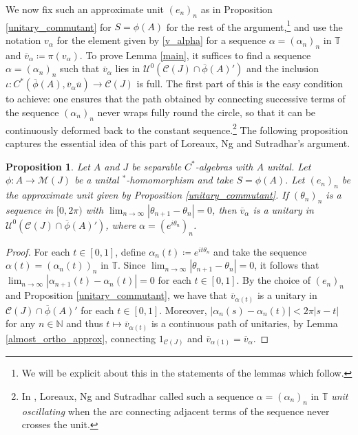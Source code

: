 \documentclass[reqno]{amsart}
\newtheorem{prop}[thm]{Proposition}
\theoremstyle{definition}
\theoremstyle{remark}
\numberwithin{equation}{section}
\theoremstyle{definition}
\newcommand{\calC}{\mathcal{C}}
\newcommand{\calM}{\mathcal{M}}
\newcommand{\calU}{\mathcal{U}}
\begin{document}
We now fix such an approximate unit $(e_n)_{n}$ as in Proposition \ref{unitary_commutant} for $S=\phi(A)$ for the rest of the argument,\footnote{We will be explicit about this in the statements of the lemmas which follow.} and use the notation $v_{\alpha}$ for the element given by \eqref{v_alpha} for a sequence $\alpha = (\alpha_{n})_{n}$ in $\mathbb{T}$ and $\overline{v}_\alpha\coloneqq \pi(v_\alpha)$. To prove Lemma \ref{main}, it suffices to find a sequence $\alpha = (\alpha_n)_n$ such that $\overline{v}_{\alpha}$ lies in $\calU^{0}(\mathcal C(J)\cap \overline\phi(A)')$ and the inclusion $\iota: C^*(\overline{\phi}(A),\overline{v}_{\alpha} \overline{u})\rightarrow \calC(J)$ is full. The first part of this is the easy condition to achieve: one ensures that the path obtained by connecting successive terms of the sequence $(\alpha_n)_{n}$ never wraps fully round the circle, so that it can be continuously deformed back to the constant sequence.\footnote{In \cite{K1-injective}, Loreaux, Ng and Sutradhar called such a sequence  $\alpha = (\alpha_{n})_{n}$ in $\mathbb{T}$ \emph{unit oscillating} when the arc connecting adjacent terms of the sequence never crosses the unit.} The following proposition captures the essential idea of this part of Loreaux, Ng and Sutradhar's argument. 

\begin{prop} 
\label{unit_osci} 
Let $A$ and $J$ be separable $C^*$-algebras with $A$ unital. Let $\phi: A\rightarrow \calM(J)$ be a unital $^*$-homomorphism and take $S = \phi(A)$. Let $(e_n)_{n}$ be the approximate unit given by Proposition \ref{unitary_commutant}. If $(\theta_n)_{n}$ is a sequence in $[0,2\pi)$ with $\lim_{n\rightarrow\infty}|\theta_{n+1}-\theta_{n}| = 0$, then $\overline{v}_{\alpha}$ is a unitary in $\calU^0(\calC(J)\cap\overline\phi(A)')$, where $\alpha = (e^{i\theta_{n}})_{n}$. 
\end{prop} 

\begin{proof} 
For each $t\in [0,1]$, define $\alpha_{n}(t) \coloneqq e^{it\theta_{n}}$ and take the sequence $\alpha(t) = (\alpha_{n}(t))_{n}$ in $\mathbb{T}$. Since $\lim_{n\rightarrow \infty}|\theta_{n+1}-\theta_{n}| = 0$, it follows that $\lim_{n\rightarrow \infty}|\alpha_{n+1}(t)-\alpha_{n}(t)| = 0$ for each $t\in [0,1]$. By the choice of $(e_{n})_{n}$ and Proposition \ref{unitary_commutant}, we have that $\overline{v}_{\alpha(t)}$ is a unitary in $\calC(J)\cap \overline{\phi}(A)'$ for each $t\in [0,1]$. Moreover, $|\alpha_{n}(s) - \alpha_{n}(t)| < 2\pi |s-t|$ for any $n\in \mathbb{N}$ and thus $t\mapsto \overline{v}_{\alpha(t)}$ is a continuous path of unitaries, by Lemma \ref{almost_ortho_approx}, connecting $1_{\calC(J)}$ and $\overline{v}_{\alpha(1)} = \overline{v}_{\alpha}$. 
\end{proof} 
\end{document}
